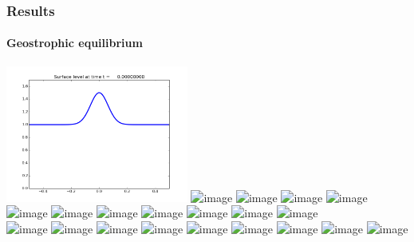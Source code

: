 \documentclass[handout]{beamer}
\begin{document}
\begin{frame}
  \frametitle{Results}
  \framesubtitle{Geostrophic equilibrium}
  \begin{center}
    \includegraphics[width=0.45\textwidth]{../results/geo-flat-initial.png}
    \includegraphics<1| handout:0>[width=0.45\textwidth]{../results/geo-flat-unbalanced-01.png}
    \includegraphics<2| handout:0>[width=0.45\textwidth]{../results/geo-flat-unbalanced-02.png}
    \includegraphics<3| handout:0>[width=0.45\textwidth]{../results/geo-flat-unbalanced-03.png}
    \includegraphics<4| handout:0>[width=0.45\textwidth]{../results/geo-flat-unbalanced-04.png}
    \includegraphics<5| handout:0>[width=0.45\textwidth]{../results/geo-flat-unbalanced-05.png}
    \includegraphics<6| handout:0>[width=0.45\textwidth]{../results/geo-flat-unbalanced-06.png}
    \includegraphics<7| handout:0>[width=0.45\textwidth]{../results/geo-flat-unbalanced-07.png}
    \includegraphics<8| handout:0>[width=0.45\textwidth]{../results/geo-flat-unbalanced-08.png}
    \includegraphics<9| handout:0>[width=0.45\textwidth]{../results/geo-flat-unbalanced-09.png}
    \includegraphics<10| handout:0>[width=0.45\textwidth]{../results/geo-flat-unbalanced-10.png}
    \includegraphics<11>[width=0.45\textwidth]{../results/geo-flat-unbalanced-11.png} \\
    \includegraphics<1| handout:0>[width=0.45\textwidth]{../results/geo-flat-rogers-01.png}
    \includegraphics<2| handout:0>[width=0.45\textwidth]{../results/geo-flat-rogers-02.png}
    \includegraphics<3| handout:0>[width=0.45\textwidth]{../results/geo-flat-rogers-03.png}
    \includegraphics<4| handout:0>[width=0.45\textwidth]{../results/geo-flat-rogers-04.png}
    \includegraphics<5| handout:0>[width=0.45\textwidth]{../results/geo-flat-rogers-05.png}
    \includegraphics<6| handout:0>[width=0.45\textwidth]{../results/geo-flat-rogers-06.png}
    \includegraphics<7| handout:0>[width=0.45\textwidth]{../results/geo-flat-rogers-07.png}
    \includegraphics<8| handout:0>[width=0.45\textwidth]{../results/geo-flat-rogers-08.png}
    \includegraphics<9| handout:0>[width=0.45\textwidth]{../results/geo-flat-rogers-09.png}

\end{center}
\end{frame}
\end{document}
